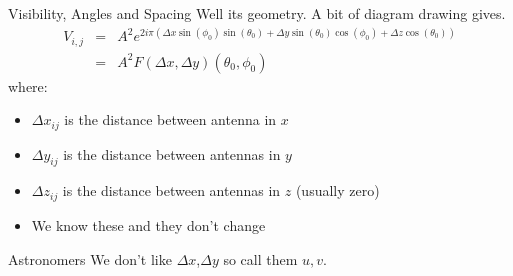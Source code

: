 \documentclass[ignorenonframetext]{beamer}
\begin{document}
\begin{frame}
\begin{columns}
\begin{column}{0.7\linewidth}
\begin{center}
  \end{center}
 \end{column}
\end{columns}
\end{frame}


\begin{frame}{Visibility, Angles and Spacing}
Well its geometry. A bit of diagram drawing gives.
 \begin{eqnarray*} V_{i,j} & = & A^2 e^{2 i \pi \left(\Delta x \sin{\left(\phi_{0} \right)} \sin{\left(\theta_{0} \right)} + \Delta y \sin{\left(\theta_{0} \right)} \cos{\left(\phi_{0} \right)} + \Delta z \cos{\left(\theta_{0} \right)}\right)}  \\
 & = & A^2 F(\Delta x, \Delta y)(\theta_0, \phi_0)
 \end{eqnarray*}
 where:
 \begin{itemize}
  \item $\Delta x_{ij}$ is the distance between antenna in $x$
  \item $\Delta y_{ij}$ is the distance between antennas in $y$
  \item $\Delta z_{ij}$ is the distance between antennas in $z$ (usually zero)
  \item We know these and they don't change
 \end{itemize}
 \begin{block}{Astronomers}
  We don't like $\Delta x$,$\Delta y$ so call them $u, v$.
 \end{block}
\end{frame}
\end{document}
